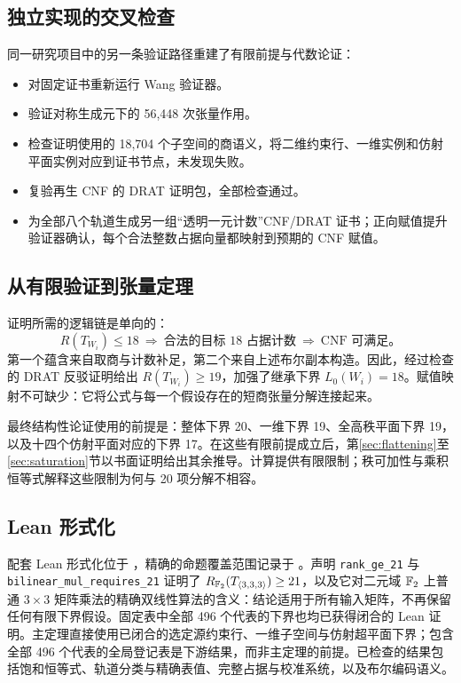 \documentclass[11pt,a4paper]{article}
\begin{document}
\subsection{独立实现的交叉检查}

同一研究项目中的另一条验证路径重建了有限前提与代数论证：
\begin{itemize}
  \item 对固定证书重新运行 Wang 验证器。
  \item 验证对称生成元下的 56,448 次张量作用。
  \item 检查证明使用的 18,704 个子空间的商语义，将二维约束行、一维实例和仿射平面实例对应到证书节点，未发现失败。
  \item 复验再生 CNF 的 DRAT 证明包，全部检查通过。
  \item 为全部八个轨道生成另一组“透明一元计数”CNF/DRAT 证书；正向赋值提升验证器确认，每个合法整数占据向量都映射到预期的 CNF 赋值。
\end{itemize}

\subsection{从有限验证到张量定理}

证明所需的逻辑链是单向的：
\begin{equation}\label{eq:finite-proof-implication}
 R(T_{W_i})\le18
 \ \Longrightarrow\ \text{合法的目标 18 占据计数}
 \ \Longrightarrow\ \text{CNF 可满足。}
\end{equation}
第一个蕴含来自取商与计数补足，第二个来自上述布尔副本构造。因此，经过检查的 DRAT 反驳证明给出 $R(T_{W_i})\ge19$，加强了继承下界 $L_0(W_i)=18$。赋值映射不可缺少：它将公式与每一个假设存在的短商张量分解连接起来。

最终结构性论证使用的前提是：整体下界 20、一维下界 19、全高秩平面下界 19，以及十四个仿射平面对应的下界 17。在这些有限前提成立后，第\ref{sec:flattening}至\ref{sec:saturation}节以书面证明给出其余推导。计算提供有限限制；秩可加性与乘积恒等式解释这些限制为何与 20 项分解不相容。

\subsection{Lean 形式化}\label{sec:lean}

配套 Lean 形式化位于 ，精确的命题覆盖范围记录于 。声明 \texttt{rank\_ge\_21} 与 \texttt{bilinear\_mul\_requires\_21} 证明了 $R_{\mathbb{F}_2}(T_{\langle3,3,3\rangle})\ge21$，以及它对二元域 $\mathbb{F}_2$ 上普通 $3\times3$ 矩阵乘法的精确双线性算法的含义：结论适用于所有输入矩阵，不再保留任何有限下界假设。固定表中全部 496 个代表的下界也均已获得闭合的 Lean 证明。主定理直接使用已闭合的选定源约束行、一维子空间与仿射超平面下界；包含全部 496 个代表的全局登记表是下游结果，而非主定理的前提。已检查的结果包括饱和恒等式、轨道分类与精确表值、完整占据与校准系统，以及布尔编码语义。
\end{document}
